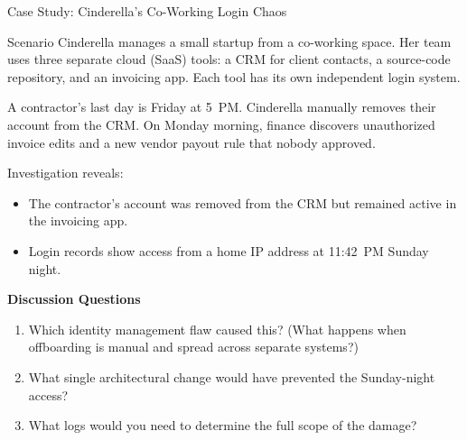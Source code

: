 \documentclass[aspectratio=169]{beamer}  %
\begin{document}
\begin{frame}{Case Study: Cinderella's Co-Working Login Chaos}
    \begin{block}{Scenario}
        \scriptsize
        Cinderella manages a small startup from a co-working space. Her team uses three separate cloud (SaaS) tools: a CRM for client contacts, a source-code repository, and an invoicing app. Each tool has its own independent login system.

        A contractor's last day is Friday at 5~PM. Cinderella manually removes their account from the CRM. On Monday morning, finance discovers unauthorized invoice edits and a new vendor payout rule that nobody approved.

        Investigation reveals:
        \begin{itemize}\setlength{\itemsep}{1pt}
            \item The contractor's account was removed from the CRM but remained active in the invoicing app.
            \item Login records show access from a home IP address at 11:42~PM Sunday night.
        \end{itemize}
    \end{block}
    \scriptsize
    \textbf{Discussion Questions}
    \begin{enumerate}\setlength{\itemsep}{1pt}
        \item Which identity management flaw caused this? (What happens when offboarding is manual and spread across separate systems?)
        \item What single architectural change would have prevented the Sunday-night access?
        \item What logs would you need to determine the full scope of the damage?
    \end{enumerate}
\end{frame}
\end{document}

